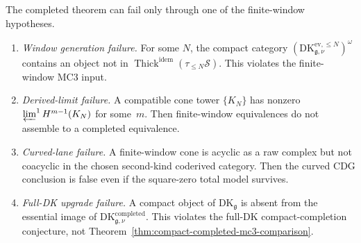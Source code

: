 \begin{remark}
\label{rem:falsification-plan-comparison-gap-completed}
The completed theorem can fail only through one of the finite-window
hypotheses.
\begin{enumerate}[label=\textup{(F\arabic*)},nosep]
\item \emph{Window generation failure.}  For some $N$, the compact
	 category
	 $(\mathrm{DK}^{\mathrm{ev},\le N}_{\mathfrak g,\nu})^\omega$
	 contains an object not in
	 $\operatorname{Thick}^{\mathrm{idem}}(\tau_{\le N}\mathcal S)$.
	 This violates the finite-window MC3 input.
\item \emph{Derived-limit failure.}  A compatible cone tower
 $\{K_N\}$ has nonzero
 $\varprojlim^1H^{m-1}(K_N)$ for some~$m$.  Then finite-window
 equivalences do not assemble to a completed equivalence.
\item \emph{Curved-lane failure.}  A finite-window cone is acyclic as
 a raw complex but not coacyclic in the chosen second-kind coderived
 category.  Then the curved CDG conclusion is false even if the
 square-zero total model survives.
\item \emph{Full-DK upgrade failure.}  A compact object of
	 $\mathrm{DK}_{\mathfrak g}$ is absent from the essential image of
	 $\mathrm{DK}^{\mathrm{completed}}_{\mathfrak g,\nu}$.  This violates
	 the full-DK compact-completion conjecture, not
	 Theorem~\ref{thm:compact-completed-mc3-comparison}.
\end{enumerate}
\end{remark}
